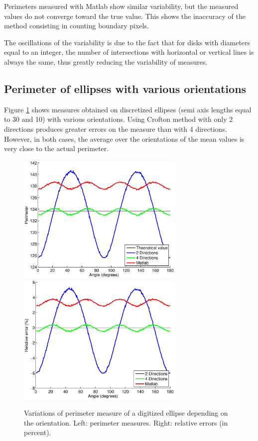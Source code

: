 \documentclass{InsightArticle}
\begin{document}
Perimeters measured with Matlab show similar variability, but the measured values do not
converge toward the true value. This shows the inaccuracy of the method consisting in
counting boundary pixels.

The oscillations of the variability is due to the fact that for disks with diameters equal to an
integer, the number of intersections with horizontal or vertical lines is always the same, 
thus greatly reducing the variability of measures. 

\subsection{Perimeter of ellipses with various orientations}

Figure \ref{fig:PerimeterOrientedEllipses} shows measures obtained on discretized ellipses 
(semi axis lengths equal to 30 and 10) with various orientations. 
Using Crofton method with only 2 directions produces greater errors on the measure than with 4 
directions. However, in both cases, the average over the orientations of the mean values is very close 
to the actual perimeter.

\begin{figure}[!htb]
\begin{center}
\includegraphics[width=8cm]{images/perimRotatedEllipses}
\includegraphics[width=8cm]{images/errorRotatedEllipses}
\end{center}
\caption{Variations of perimeter measure of a digitized ellipse depending on the orientation. 
Left: perimeter measures. Right: relative errors (in percent).}
\label{fig:PerimeterOrientedEllipses}
\end{figure}
\end{document}

